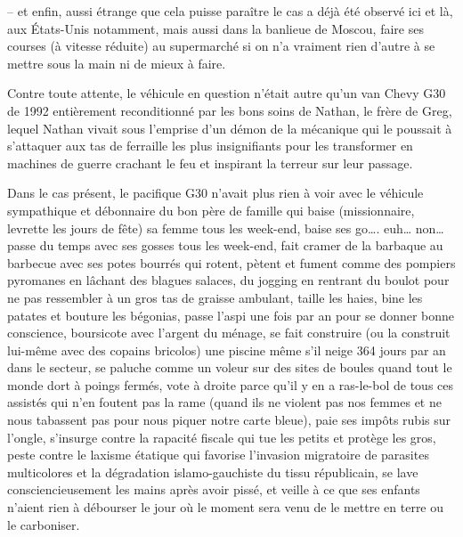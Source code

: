 – et enfin, aussi étrange que cela puisse paraître le cas a déjà été observé ici et là, aux États-Unis notamment, mais aussi dans la banlieue de Moscou, faire ses courses (à vitesse réduite) au supermarché si on n’a vraiment rien d’autre à se mettre sous la main ni de mieux à faire.

\illusloflabel{}%
Contre toute attente, le véhicule en question n’était autre qu’un van Chevy G30 de 1992 entièrement reconditionné par les bons soins de Nathan, le frère de Greg, lequel Nathan vivait sous l’emprise d’un démon de la mécanique qui le poussait à s’attaquer aux tas de ferraille les plus insignifiants pour les transformer en machines de guerre crachant le feu et inspirant la terreur sur leur passage.

Dans le cas présent, le pacifique G30 n’avait plus rien à voir avec \label{rat:25}le véhicule sympathique et débonnaire du bon père de famille qui baise (missionnaire, levrette les jours de fête) sa femme tous les week-end, baise ses go…. euh… non… passe du temps avec ses gosses tous les week-end, fait cramer de la barbaque au barbecue avec ses potes bourrés qui rotent, pètent et fument comme des pompiers pyromanes en lâchant des blagues salaces, du jogging en rentrant du boulot pour ne pas ressembler à un gros tas de graisse ambulant, taille les haies, bine les patates et bouture les bégonias, passe l’aspi une fois par an pour se donner bonne conscience, boursicote avec l’argent du ménage, se fait construire (ou la construit lui-même avec des copains bricolos) une piscine même s’il neige 364 jours par an dans le secteur, se paluche comme un voleur sur des sites de boules quand tout le monde dort à poings fermés, vote à droite parce qu’il y en a ras-le-bol de tous ces assistés qui n’en foutent pas la rame (quand ils ne violent pas nos femmes et ne nous tabassent pas pour nous piquer notre carte bleue), paie ses impôts rubis sur l’ongle, s’insurge contre la rapacité fiscale qui tue les petits et protège les gros, peste contre le laxisme étatique qui favorise l’invasion migratoire de parasites multicolores et la dégradation islamo-gauchiste du tissu républicain, se lave consciencieusement les mains après avoir pissé, et veille à ce que ses enfants n’aient rien à débourser le jour où le moment sera venu de le mettre en terre ou le carboniser.

